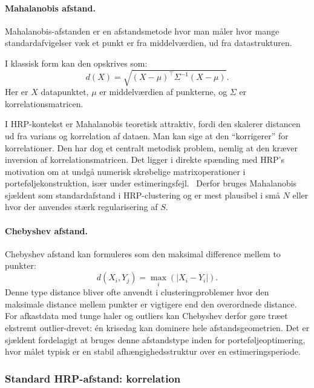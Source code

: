 \documentclass[../main.tex]{subfiles}
\begin{document}
\paragraph{Mahalanobis afstand.}
Mahalanobis-afstanden er en afstandsmetode hvor man måler hvor mange standardafvigelser væk et punkt er fra middelværdien, ud fra datastrukturen.~\cite{kumar_mahalanobis_2025}

I klassisk form kan den opskrives som:
\[
    d(X)=\sqrt{(X-\mu)^\top \Sigma^{-1}(X-\mu)}.
\]
Her er $X$ datapunktet, $\mu$ er middelværdien af punkterne, og $\Sigma$ er korrelationsmatricen.

I HRP-kontekst er Mahalanobis teoretisk attraktiv, fordi den skalerer distancen ud fra varians og korrelation af dataen. Man kan sige at den ``korrigerer'' for korrelationer. Den har dog et centralt metodisk problem, nemlig at den kræver inversion af korrelationsmatricen. Det ligger i direkte spænding med HRP's motivation om at undgå numerisk skrøbelige matrixoperationer i porteføljekonstruktion, især under estimeringsfejl.~\cite{kaae_karppinen_hierarchical_2022} Derfor bruges Mahalanobis sjældent som standardafstand i HRP-clustering og er mest plausibel i små $N$ eller hvor der anvendes stærk regularisering af $S$.

\paragraph{Chebyshev afstand.}
Chebyshev afstand kan formuleres som den maksimal difference mellem to punkter:
\[
    d(X_i,Y_j)=\max_i (|X_i-Y_i|).
\]
Denne type distance bliver ofte anvendt i clusteringproblemer hvor den maksimale distance mellem punkter er vigtigere end den overordnede distance.~\cite{chugani_chebyshev_nodate} For afkastdata med tunge haler og outliers kan Chebyshev derfor gøre træet ekstremt outlier-drevet: én krisedag kan dominere hele afstandsgeometrien. Det er sjældent fordelagigt at bruges denne afstandstype inden for porteføljeoptimering, hvor målet typisk er en stabil afhængighedsstruktur over en estimeringsperiode.

\subsubsection{Standard HRP-afstand: korrelation}
\end{document}
